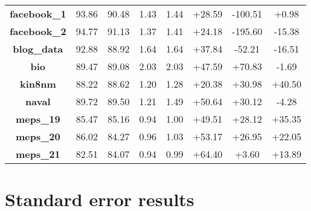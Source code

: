 \documentclass{article}
\begin{document}
\begin{appendices}
\begin{table}[htbp]
{\begin{tabular}{cccccccc}
    \midrule
    
    \textbf{facebook\_1} & 93.86  & 90.48  & 1.43  & 1.44  & \textcolor[rgb]{ 0,  .502,  0}{+28.59} & \textcolor[rgb]{ 1,  0,  0}{-100.51} & \textcolor[rgb]{ 0,  .502,  0}{+0.98} \\
    \textbf{facebook\_2} & 94.77  & 91.13  & 1.37  & 1.41  & \textcolor[rgb]{ 0,  .502,  0}{+24.18} & \textcolor[rgb]{ 1,  0,  0}{-195.60} & \textcolor[rgb]{ 1,  0,  0}{-15.38} \\
    \textbf{blog\_data} & 92.88  & 88.92  & 1.64  & 1.64  & \textcolor[rgb]{ 0,  .502,  0}{+37.84} & \textcolor[rgb]{ 1,  0,  0}{-52.21} & \textcolor[rgb]{ 1,  0,  0}{-16.51} \\
    \textbf{bio} & 89.47  & 89.08  & 2.03  & 2.03  & \textcolor[rgb]{ 0,  .502,  0}{+47.59} & \textcolor[rgb]{ 0,  .502,  0}{+70.83} & \textcolor[rgb]{ 1,  0,  0}{-1.69} \\
    \textbf{kin8nm} & 88.22  & 88.62  & 1.20  & 1.28  & \textcolor[rgb]{ 0,  .502,  0}{+20.38} & \textcolor[rgb]{ 0,  .502,  0}{+30.98} & \textcolor[rgb]{ 0,  .502,  0}{+40.50} \\
    \textbf{naval} & 89.72  & 89.50  & 1.21  & 1.49  & \textcolor[rgb]{ 0,  .502,  0}{+50.64} & \textcolor[rgb]{ 0,  .502,  0}{+30.12} & \textcolor[rgb]{ 1,  0,  0}{-4.28} \\
    \textbf{meps\_19} & 85.47  & 85.16  & 0.94  & 1.00  & \textcolor[rgb]{ 0,  .502,  0}{+49.51} & \textcolor[rgb]{ 0,  .502,  0}{+28.12} & \textcolor[rgb]{ 0,  .502,  0}{+35.35} \\
    \textbf{meps\_20} & 86.02  & 84.27  & 0.96  & 1.03  & \textcolor[rgb]{ 0,  .502,  0}{+53.17} & \textcolor[rgb]{ 0,  .502,  0}{+26.95} & \textcolor[rgb]{ 0,  .502,  0}{+22.05} \\
    \textbf{meps\_21} & 82.51  & 84.07  & 0.94  & 0.99  & \textcolor[rgb]{ 0,  .502,  0}{+64.40} & \textcolor[rgb]{ 0,  .502,  0}{+3.60} & \textcolor[rgb]{ 0,  .502,  0}{+13.89} 
    \\

    
    
    \bottomrule[1.1pt]
    
    \end{tabular}%
    }
  \label{tab:real_pinball_hsic_vs_corr}%
\end{table}%


\section{Standard error results}\label{sec:std_err_results}


\end{appendices}
\end{document}
